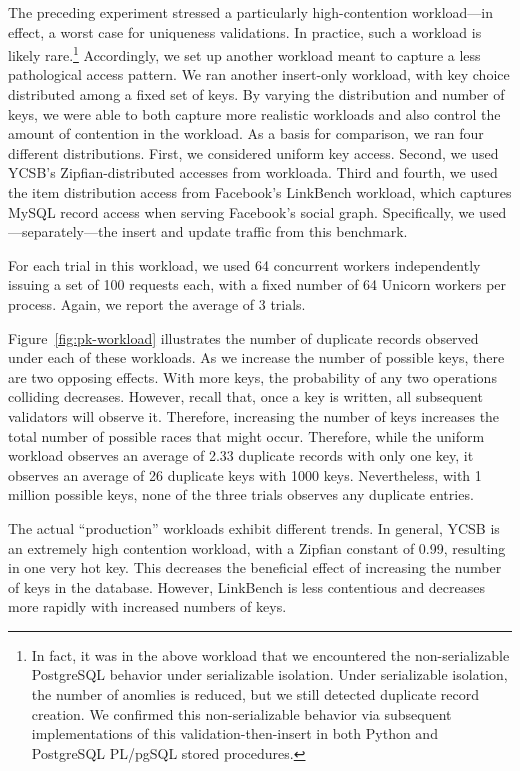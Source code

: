 The preceding experiment stressed a particularly high-contention
workload---in effect, a worst case for uniqueness validations. In
practice, such a workload is likely rare.\footnote{In fact, it was in
  the above workload that we encountered the non-serializable
  PostgreSQL behavior under serializable isolation. Under serializable
  isolation, the number of anomlies is reduced, but we still detected
  duplicate record creation. We confirmed this non-serializable
  behavior via subsequent implementations of this
  validation-then-insert in both Python and PostgreSQL PL/pgSQL stored
  procedures.} Accordingly, we set up another workload meant to
capture a less pathological access pattern. We ran another insert-only
workload, with key choice distributed among a fixed set of keys. By
varying the distribution and number of keys, we were able to both
capture more realistic workloads and also control the amount of
contention in the workload. As a basis for comparison, we ran four
different distributions. First, we considered uniform key
access. Second, we used YCSB's Zipfian-distributed accesses from
workloada. Third and fourth, we used the item distribution access from
Facebook's LinkBench workload, which captures MySQL record access when
serving Facebook's social graph. Specifically, we
used---separately---the insert and update traffic from this
benchmark.

For each trial in this workload, we used 64 concurrent workers
independently issuing a set of 100 requests each, with a fixed number
of 64 Unicorn workers per process. Again, we report the average of 3
trials.

Figure~\ref{fig:pk-workload} illustrates the number of duplicate
records observed under each of these workloads. As we increase the
number of possible keys, there are two opposing effects. With
more keys, the probability of any two operations colliding
decreases. However, recall that, once a key is written, all subsequent
validators will observe it. Therefore, increasing the number of keys
increases the total number of possible races that might
occur. Therefore, while the uniform workload observes an average of
2.33 duplicate records with only one key, it observes an average of 26
duplicate keys with 1000 keys. Nevertheless, with 1 million possible
keys, none of the three trials observes any duplicate entries.

The actual ``production'' workloads exhibit different trends. In
general, YCSB is an extremely high contention workload, with a Zipfian
constant of 0.99, resulting in one very hot key. This decreases the
beneficial effect of increasing the number of keys in the
database. However, LinkBench is less contentious and decreases more
rapidly with increased numbers of keys.

